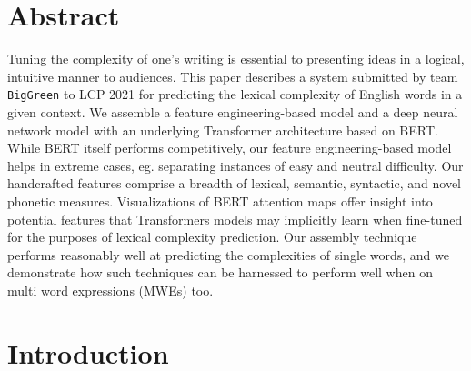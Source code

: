 \documentclass{dcthesis}
\theoremstyle{definition}
\theoremstyle{remark}
\begin{document}
\chapter*{Abstract}
Tuning the complexity of one's writing is essential to presenting ideas in a logical, intuitive manner to audiences. This paper describes a system submitted by team \texttt{BigGreen} to LCP 2021 for predicting the lexical complexity of English words in a given context. We assemble a feature engineering-based model and a deep neural network model with an underlying Transformer architecture based on BERT. While BERT itself performs competitively, our feature engineering-based model helps in extreme cases, eg. separating instances of easy and neutral difficulty. Our handcrafted features comprise a breadth of lexical, semantic, syntactic, and novel phonetic measures. Visualizations of BERT attention maps offer insight into potential features that Transformers models may implicitly learn when fine-tuned for the purposes of lexical complexity prediction. Our assembly technique performs reasonably well at predicting the complexities of single words, and we demonstrate how such techniques can be harnessed to perform well when on multi word expressions (MWEs) too.

\tableofcontents



\mainmatter


\chapter{Introduction}
\end{document}
